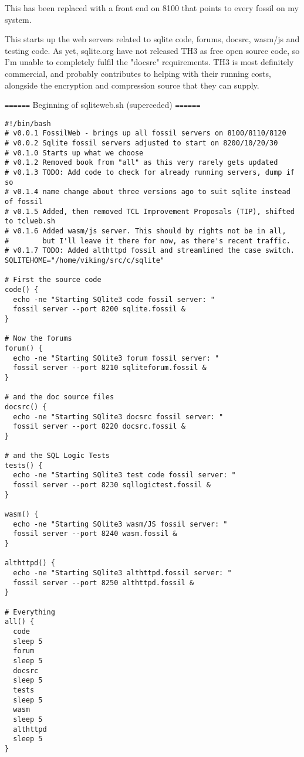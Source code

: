 \documentclass[11pt]{article}
\begin{document}
This has been replaced with a front end on 8100 that points to every fossil on my system.

This starts up the web servers related to sqlite code, forums, docsrc, wasm/js and testing code. As
yet, sqlite.org have not released TH3 as free open source code, so I'm unable to completely fulfil
the "docsrc" requirements. TH3 is most definitely commercial, and probably contributes to helping
with their running costs, alongside the encryption and compression source that they can supply.

\texttt{======} Beginning of sqliteweb.sh (superceded) \texttt{======}

\begin{verbatim}
#!/bin/bash
# v0.0.1 FossilWeb - brings up all fossil servers on 8100/8110/8120
# v0.0.2 Sqlite fossil servers adjusted to start on 8200/10/20/30
# v0.1.0 Starts up what we choose
# v0.1.2 Removed book from "all" as this very rarely gets updated
# v0.1.3 TODO: Add code to check for already running servers, dump if so
# v0.1.4 name change about three versions ago to suit sqlite instead of fossil
# v0.1.5 Added, then removed TCL Improvement Proposals (TIP), shifted to tclweb.sh
# v0.1.6 Added wasm/js server. This should by rights not be in all,
#        but I'll leave it there for now, as there's recent traffic.
# v0.1.7 TODO: Added althttpd fossil and streamlined the case switch.
SQLITEHOME="/home/viking/src/c/sqlite"

# First the source code
code() {
  echo -ne "Starting SQlite3 code fossil server: "
  fossil server --port 8200 sqlite.fossil &
}

# Now the forums
forum() {
  echo -ne "Starting SQlite3 forum fossil server: "
  fossil server --port 8210 sqliteforum.fossil &
}

# and the doc source files
docsrc() {
  echo -ne "Starting SQlite3 docsrc fossil server: "
  fossil server --port 8220 docsrc.fossil &
}

# and the SQL Logic Tests
tests() {
  echo -ne "Starting SQlite3 test code fossil server: "
  fossil server --port 8230 sqllogictest.fossil &
}

wasm() {
  echo -ne "Starting SQlite3 wasm/JS fossil server: "
  fossil server --port 8240 wasm.fossil &
}

althttpd() {
  echo -ne "Starting SQlite3 althttpd.fossil server: "
  fossil server --port 8250 althttpd.fossil &
}

# Everything
all() {
  code
  sleep 5
  forum
  sleep 5
  docsrc
  sleep 5
  tests
  sleep 5
  wasm
  sleep 5
  althttpd
  sleep 5
}


\end{verbatim}
\end{document}
